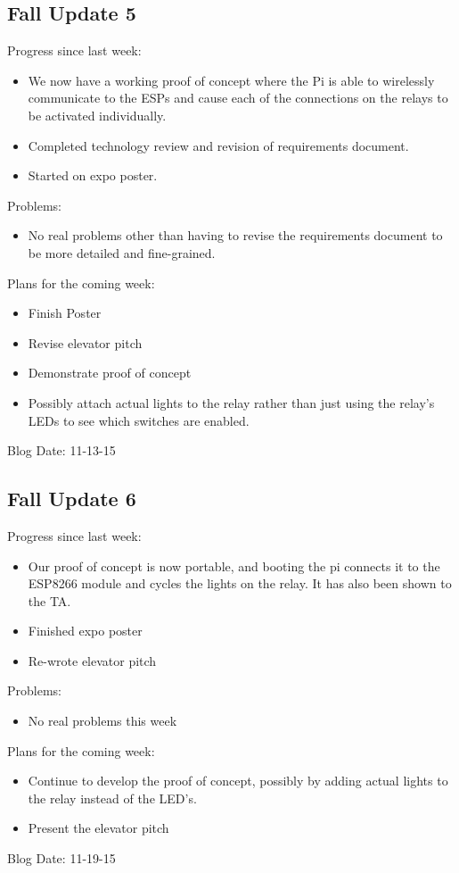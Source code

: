 \subsection{Fall Update 5}
Progress since last week:
\begin{itemize}
\item We now have a working proof of concept where the Pi is able to wirelessly communicate to the ESPs and cause each of the connections on the relays to be activated individually.
\item Completed technology review and revision of requirements document.
\item Started on expo poster.
\end{itemize}
Problems:
\begin{itemize}
\item No real problems other than having to revise the requirements document to be more detailed and fine-grained.
\end{itemize}
Plans for the coming week: 
\begin{itemize}
\item Finish Poster
\item Revise elevator pitch
\item Demonstrate proof of concept
\item Possibly attach actual lights to the relay rather than just using the relay's LEDs to see which switches are enabled.
\end{itemize}
Blog Date: 11-13-15

\subsection{Fall Update 6}
Progress since last week:
\begin{itemize}
\item Our proof of concept is now portable, and booting the pi connects it to the ESP8266 module and cycles the lights on the relay.​ It has also been shown to the TA.
\item Finished expo poster
\item Re-wrote elevator pitch
\end{itemize}
Problems:
\begin{itemize}
\item No real problems this week
\end{itemize}
Plans for the coming week: 
\begin{itemize}
\item Continue to develop the proof of concept, possibly by adding actual lights to the relay instead of the LED's.
\item Present the elevator pitch​
\end{itemize}
Blog Date: 11-19-15

